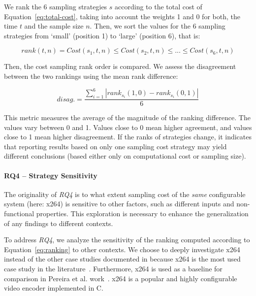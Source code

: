 We rank the 6 sampling strategies $s$ according to the total cost of Equation~\ref{eq:total-cost}, taking into account the weights 1 and 0 for both, the time $t$ and the sample size $n$. Then, we sort the values for the 6 sampling strategies from ‘small’ (position 1) to ‘large’ (position 6), that is:

\begin{equation}
    rank(t,n) = Cost(s_1,t,n) \leq Cost(s_2,t,n) \leq ... \leq Cost(s_6,t,n)
    \label{eq:ranking}
\end{equation}

Then, the cost sampling rank order is compared.
We assess the disagreement between the two rankings using the mean rank difference:

\begin{equation}
    disag. = \frac{\sum_{i=1}^{6} |rank_{s_{i}}(1,0) - rank_{s_{i}}(0,1)|}{6}
    \label{eq:disagreement}
\end{equation}

This metric
measures the average of the magnitude of the ranking difference. The values vary between 0 and 1.
Values close to 0 mean higher agreement, and values close to 1 mean higher disagreement.
If the ranks of strategies change, it indicates that reporting results based on only one sampling cost strategy may yield different conclusions (\ie based either only on computational cost or sampling size).


\paragraph{RQ4 – Strategy Sensitivity}
The originality of \textit{RQ4} is to what extent sampling cost of the \emph{same} configurable system (here: x264) is sensitive to other factors, such as different inputs and non-functional properties.
This exploration is necessary to enhance the generalization of any findings to different contexts. 

To address \textit{RQ4}, we analyze the sensitivity of the ranking computed according to Equation~\ref{eq:ranking} to other contexts.
We choose to deeply investigate x264 instead of the other case studies documented in  because x264 is the most used case study in the literature~\cite{julianasurvey}.
Furthermore, x264 is used as a baseline for comparison in Pereira et al. work~\cite{pereira2020}.
x264 is a popular and highly configurable video encoder implemented in C.

